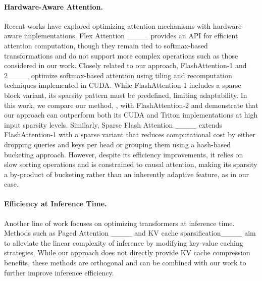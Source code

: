 \paragraph{Hardware-Aware Attention.} Recent works have explored optimizing attention mechanisms with hardware-aware implementations. Flex Attention ____ provides an API for efficient attention computation, though they remain tied to softmax-based transformations and do not support more complex operations such as those considered in our work. 
Closely related to our approach, FlashAttention-1 and 2____ optimize softmax-based attention using tiling and recomputation techniques implemented in CUDA. While FlashAttention-1 includes a sparse block variant, its sparsity pattern must be predefined, limiting adaptability. In this work, we compare our method, \methodname, with FlashAttention-2 and demonstrate that our approach can outperform both its CUDA and Triton implementations at high input sparsity levels.
Similarly, Sparse Flash Attention ____ extends FlashAttention-1 with a sparse variant that reduces computational cost by either dropping queries and keys per head or grouping them using a hash-based bucketing approach.
However, despite its efficiency improvements, it relies on slow sorting operations and is constrained to causal attention, making its sparsity a by-product of bucketing rather than an inherently adaptive feature, as in our case.

\paragraph{Efficiency at Inference Time.} Another line of work focuses on optimizing transformers at inference time. Methods such as Paged Attention ____ and KV cache sparsification____ aim to alleviate the linear complexity of inference by modifying key-value caching strategies. While our approach does not directly provide KV cache compression benefits, these methods are orthogonal and can be combined with our work to further improve inference efficiency.